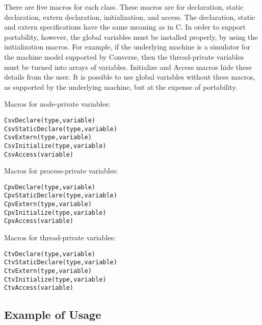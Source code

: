 There are five macros for each class. These macros are for
declaration, static declaration, extern declaration, initialization, and
access. The declaration, static and extern specifications have the same
meaning as in C. In order to support portability, however, the global
variables must be installed properly, by using the initialization macros.
For example, if the underlying machine is a simulator for the machine model 
supported by Converse, then the thread-private variables must be turned into 
arrays of variables.  Initialize and Access macros hide these details from 
the user.  It is possible to use global variables without these macros, 
as supported by the underlying machine, but at the expense of portability.


Macros for node-private variables:
\begin{verbatim}
CsvDeclare(type,variable)
CsvStaticDeclare(type,variable)
CsvExtern(type,variable)
CsvInitialize(type,variable)
CsvAccess(variable)
\end{verbatim}


Macros for process-private variables:
\begin{verbatim}
CpvDeclare(type,variable)
CpvStaticDeclare(type,variable)
CpvExtern(type,variable)
CpvInitialize(type,variable)
CpvAccess(variable)
\end{verbatim}

Macros for thread-private variables:
\begin{verbatim}
CtvDeclare(type,variable)
CtvStaticDeclare(type,variable)
CtvExtern(type,variable)
CtvInitialize(type,variable)
CtvAccess(variable)
\end{verbatim}


\subsection{Example of Usage}

